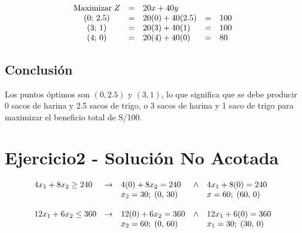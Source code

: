 \documentclass[12pt]{article}
\begin{document}
\[
\begin{array}{c c l c l}
\text{Maximizar}\;Z & = & 20x + 40y       &   &     \\
(0;\, 2.5)          & = & 20(0) + 40(2.5) & = & 100 \\
(3;\, 1)            & = & 20(3) + 40(1)   & = & 100 \\
(4;\, 0)            & = & 20(4) + 40(0)   & = & 80  \\
\end{array}
\]

\subsection*{Conclusión}
Los puntos óptimos son \((0, 2.5)\) y \((3, 1)\), lo que significa que se debe producir 0 sacos de harina y 2.5 sacos de trigo, o 3 sacos de harina y 1 saco de trigo para maximizar el beneficio total de S/100.










\newpage
\section*{Ejercicio2 - Solución No Acotada}
\[
\begin{array}{l l l l l l l}
  4x_1 + 8x_2 \geq 240 & \rightarrow & 4(0) + 8x_2 = 240        & \wedge & 4x_1 + 8(0) = 240   \\
                      &             & x_2 = 30;\; (0,\,30)  &        & x = 60;\; (60,\,0)   \\
                      &             &                         &        &                    \\
  12x_1 + 6x_2 \leq 360      & \rightarrow & 12(0) + 6x_2 = 360        & \wedge & 12x_1 + 6(0) = 360   \\
                      &             & x_2 = 60;\; (0,\,60)      &        & x_1 = 30;\; (30,\,0) \\
\end{array}
\]

\vspace{0.5cm}
\end{document}
